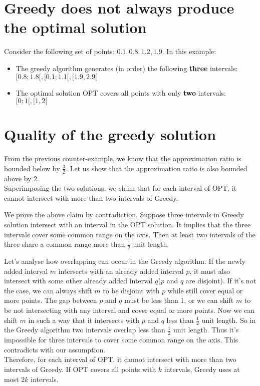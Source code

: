 
\section{Greedy does not always produce the optimal solution}

Consider the following set of points: ${0.1, 0.8, 1.2, 1.9}$. In this example:
\begin{itemize}
  \item The greedy algorithm generates (in order) the following \textbf{three} intervals: $[0.8; 1.8[, [0.1; 1.1[, [1.9, 2.9[$
  \item The optimal solution OPT covers all points with only \textbf{two} intervals: $[0; 1[, [1, 2[$
\end{itemize}

\section{Quality of the greedy solution}

From the previous counter-example, we know that the approximation ratio is bounded below by $\frac{3}{2}$. Let us show that the approximation ratio is also bounded above by $2$.\\

Superimposing the two solutions, we claim that for each interval of OPT, it cannot intersect with more than two intervals of Greedy.

We prove the above claim by contradiction. Suppose three intervals in Greedy solution intersect with an interval in the OPT solution. It implies that the three intervals cover some common range on the axis. Then at least two intervals of the three share a common range more than $\frac{1}{2}$ unit length.

Let's analyse how overlapping can occur in the Greedy algorithm. If the newly added interval $m$ intersects with an already added interval $p$, it must also intersect with some other already added interval $q$($p$ and $q$ are disjoint). If it's not the case, we can always shift $m$ to be disjoint with $p$ while still cover equal or more points. The gap between $p$ and $q$ must be less than 1, or we can shift $m$ to be not intersecting with any interval and cover equal or more points. Now we can shift $m$ in such a way that it intersects with $p$ and $q$ less than $\frac{1}{2}$ unit length. So in the Greedy algorithm two intervals overlap less than $\frac{1}{2}$ unit length. Thus it's impossible for three intervals to cover some common range on the axis. This contradicts with our assumption.\\

Therefore, for each interval of OPT, it cannot intersect with more than two intervals of Greedy. If OPT covers all points with $k$ intervals, Greedy uses at most $2k$ intervals.
